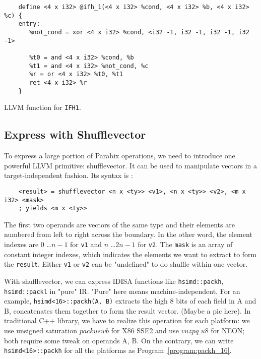 \begin{program}
  \begin{verbatim}
    define <4 x i32> @ifh_1(<4 x i32> %cond, <4 x i32> %b, <4 x i32> %c) {
    entry:
       %not_cond = xor <4 x i32> %cond, <i32 -1, i32 -1, i32 -1, i32 -1>

       %t0 = and <4 x i32> %cond, %b
       %t1 = and <4 x i32> %not_cond, %c
       %r = or <4 x i32> %t0, %t1
       ret <4 x i32> %r
    }
  \end{verbatim}
  \caption{LLVM function for {\tt IFH1}.}
  \label{program:ifh1}
\end{program}

\subsection{Express with Shufflevector}
To express a large portion of Parabix operations, we need to introduce one powerful LLVM primitive: shufflevector. It can be used to manipulate vectors in a target-independent fashion. Its syntax is \cite{llvm_lang_ref}:

\begin{verbatim}
    <result> = shufflevector <n x <ty>> <v1>, <n x <ty>> <v2>, <m x i32> <mask>
    ; yields <m x <ty>>
\end{verbatim}

The first two operands are vectors of the same type and their elements are numbered from left to right across the boundary. In the other word, the element indexes are $0$ \ldots $n-1$ for {\tt v1} and $n$ \ldots $2n-1$ for {\tt v2}. The {\tt mask} is an array of constant integer indexes, which indicates the elements we want to extract to form the {\tt result}. Either {\tt v1} or {\tt v2} can be "undefined" to do shuffle within one vector.

With shufflevector, we can express IDISA functions like \verb|hsimd::packh|, \verb|hsimd::packl| in "pure" IR. "Pure" here means machine-independent. For an example, \verb|hsimd<16>::packh(A, B)| extracts the high 8 bits of each field in A and B, concatenates them together to form the result vector. (Maybe a pic here). In traditional C++ library, we have to realize this operation for each platform: we use unsigned saturation $packuswb$ for X86 SSE2 and use $vuzpq\_u8$ for NEON; both require some tweak on operands A, B. On the contrary, we can write \verb|hsimd<16>::packh| for all the platforms as Program~\ref{program:packh_16}.

